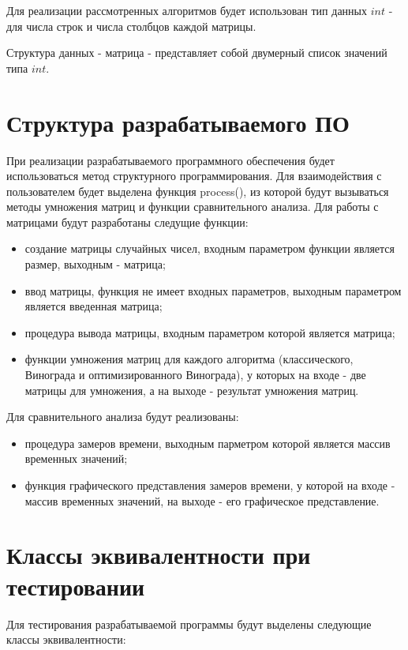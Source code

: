 Для реализации рассмотренных алгоритмов будет использован тип данных $int$ - для числа строк и числа столбцов каждой матрицы.

Структура данных - матрица - представляет собой двумерный список значений типа $int$.

\section{Структура разрабатываемого ПО}

При реализации разрабатываемого программного обеспечения будет использоваться метод структурного программирования. Для взаимодействия с пользователем будет выделена функция process(), из которой будут вызываться методы умножения матриц и функции сравнительного анализа. Для работы с матрицами будут разработаны следущие функции:

\begin{itemize}
	\item создание матрицы случайных чисел, входным параметром функции является размер, выходным - матрица;
	\item ввод матрицы, функция не имеет входных параметров, выходным параметром является введенная матрица;
	\item процедура вывода матрицы, входным параметром которой является матрица;
	\item функции умножения матриц для каждого алгоритма (классического, Винограда и оптимизированного Винограда), у которых на входе - две матрицы для умножения, а на выходе - результат умножения матриц. 
\end{itemize}

Для сравнительного анализа будут реализованы:

\begin{itemize}
	\item процедура замеров времени, выходным парметром которой является массив временных значений;
	\item функция графического представления замеров времени, у которой на входе - массив временных значений, на выходе - его графическое представление.
\end{itemize}

\section{Классы эквивалентности при тестировании}

Для тестирования разрабатываемой программы будут выделены следующие классы эквивалентности:

